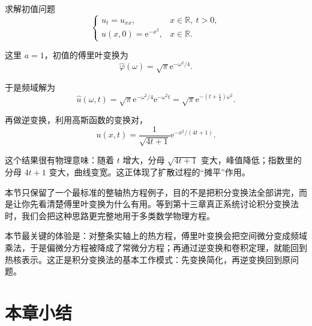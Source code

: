 \begin{lizi}{}{}
求解初值问题
\begin{equation}
    \begin{cases}
        u_t=u_{xx}, & x\in\mathbb{R},\ t>0, \\
        u(x,0)=\mathrm{e}^{-x^2}, & x\in\mathbb{R}.
    \end{cases}
\end{equation}

\begin{jie}
这里 $a=1$，初值的傅里叶变换为
\begin{equation}
    \hat{\varphi}(\omega)=\sqrt{\pi}\mathrm{e}^{-\omega^2/4}.
\end{equation}

于是频域解为
\begin{equation}
    \hat{u}(\omega,t)=\sqrt{\pi}\mathrm{e}^{-\omega^2/4}\mathrm{e}^{-\omega^2 t}
    =
    \sqrt{\pi}\mathrm{e}^{-(t+\frac14)\omega^2}.
\end{equation}

再做逆变换，利用高斯函数的变换对，
\begin{equation}
    u(x,t)
    =
    \frac{1}{\sqrt{4t+1}}\mathrm{e}^{-x^2/(4t+1)}.
\end{equation}

这个结果很有物理意味：随着 $t$ 增大，分母 $\sqrt{4t+1}$ 变大，峰值降低；指数里的分母 $4t+1$ 变大，曲线变宽。这正体现了扩散过程的``摊平''作用。
\end{jie}
\end{lizi}

\begin{tishi}[本章和后续章节怎样分工]
本节只保留了一个最标准的整轴热方程例子，目的不是把积分变换法全部讲完，而是让你先看清楚傅里叶变换为什么有用。等到第十三章真正系统讨论积分变换法时，我们会把这种思路更完整地用于多类数学物理方程。
\end{tishi}

\begin{tishi}[本节小结]
本节最关键的体验是：对整条实轴上的热方程，傅里叶变换会把空间微分变成频域乘法，于是偏微分方程被降成了常微分方程；再通过逆变换和卷积定理，就能回到热核表示。这正是积分变换法的基本工作模式：先变换简化，再逆变换回到原问题。
\end{tishi}

\section{本章小结}

